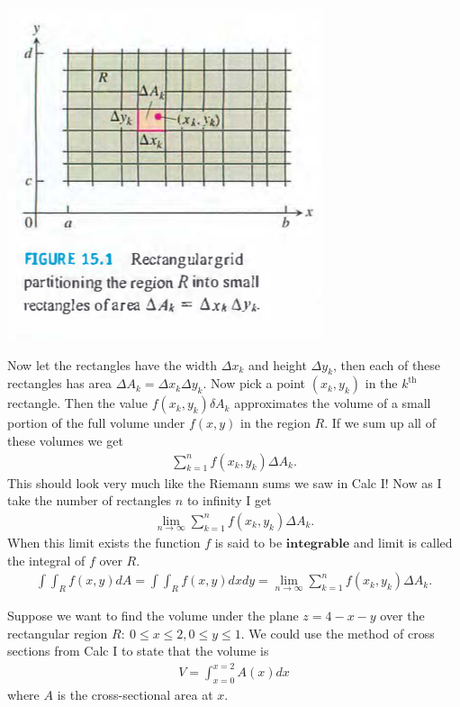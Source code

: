 \documentclass[12pt, letter]{article}
\theoremstyle{plain}
\numberwithin{theorem}{section}
\theoremstyle{definition}
\begin{document}
\begin{center}
\includegraphics[scale=0.7]{m3_f1}
\end{center}

\bigskip

Now let the rectangles have the width $\Delta x_k$ and height $\Delta y_k$, then each of these rectangles has area $\Delta A_k = \Delta x_k \Delta y_k$. Now pick a point $(x_k,y_k)$ in the $k^{\text{th}}$ rectangle. Then the value $f(x_k,y_k) \delta A_k$ approximates the volume of a small portion of the full volume under $f(x,y)$ in the region $R$. If we sum up all of these volumes we get
\begin{align*}
\sum_{k=1}^n f(x_k,y_k) \Delta A_k.
\end{align*}
This should look very much like the Riemann sums we saw in Calc I! Now as I take the number of rectangles $n$ to infinity I get
\begin{align*}
\lim_{n\to\infty} \sum_{k=1}^n f(x_k,y_k) \Delta A_k.
\end{align*}
When this limit exists the function $f$ is said to be $\textbf{integrable}$ and limit is called the integral of $f$ over $R$.
\begin{align*}
\int \int_R f(x,y) dA = \int \int_{R} f(x,y) dx dy = \lim_{n\to\infty} \sum_{k=1}^n f(x_k,y_k) \Delta A_k.
\end{align*}

\bigskip

\hrulefill

\bigskip

Suppose we want to find the volume under the plane $z=4-x-y$ over the rectangular region $R: \ 0 \leq x \leq 2, 0 \leq y \leq 1$. We could use the method of cross sections from Calc I to state that the volume is
\begin{align*}
V = \int_{x=0}^{x=2} A(x) dx
\end{align*}
where $A$ is the cross-sectional area at $x$.
\end{document}
